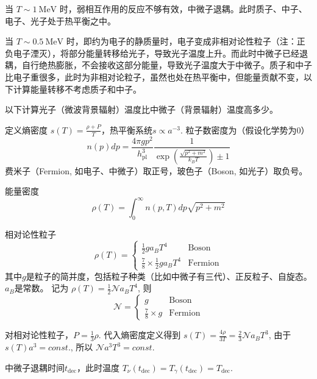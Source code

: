 \documentclass[]{ctexart}
\begin{document}
当 $T \sim 1 \mathrm{~MeV}$ 时，弱相互作用的反应不够有效，中微子退耦。此时质子、中子、电子、光子处于热平衡之中。

当 $T \sim 0.5 \mathrm{~MeV}$ 时，即约为电子的静质量时，电子变成非相对论性粒子（注：正负电子湮灭），将部分能量转移给光子，导致光子温度上升。而此时中微子已经退耦，自行绝热膨胀，不会接收这部分能量，导致光子温度大于中微子。质子和中子比电子重很多，此时为非相对论粒子，虽然也处在热平衡中，但能量贡献不变，以下计算能量转移不考虑质子和中子。

以下计算光子（微波背景辐射）温度比中微子（背景辐射）温度高多少。

定义熵密度 $s(T) = \frac{\rho+P}{T}$，热平衡系统$s\propto a^{-3}$.
粒子数密度为（假设化学势为0）
\begin{equation}
    n(p) dp = \frac{4\pi g p^2}{h_{\mathrm{pl}}^3} \frac{1}{\exp\left(\frac{\sqrt{p^2+m^2}}{k_B T}\right) \pm 1}
\end{equation}
费米子（Fermion, 如电子、中微子）取正号，玻色子（Boson, 如光子）取负号。

能量密度
\begin{equation}
    \rho (T) = \int_0^\infty n(p,T) dp \sqrt{p^2+m^2}
\end{equation}

相对论性粒子
\begin{equation}
    \rho(T) =
    \begin{cases}
        \frac{1}{2} g a_B T^4   & \text{Boson} \\ 
        \frac{7}{8} \times \frac{1}{2} g a_B T^4 & \text{Fermion}
    \end{cases}
\end{equation}
其中$g$是粒子的简并度，包括粒子种类（比如中微子有三代）、正反粒子、自旋态。$a_B$是常数。
记为 $\rho(T) = \frac{1}{2} \mathcal{N} a_B T^4 $, 则
\begin{equation}
    \mathcal{N} =
    \begin{cases}
        g  & \text{Boson} \\ 
        \frac{7}{8} \times g  & \text{Fermion}
    \end{cases}
\end{equation}

对相对论性粒子，$P=\frac{1}{3}\rho$.
代入熵密度定义得到
$s(T) = \frac{4\rho}{3T} = \frac{2}{3} \mathcal{N} a_B T^3$,
由于$s(T) a^3 = const.$,
所以 
$\mathcal{N} a^3 T^3 = const.$

中微子退耦时间$t_\text{dec}$，此时温度 $T_\nu(t_\text{dec}) = T_\gamma(t_\text{dec}) = T_\text{dec}$.
\end{document}
